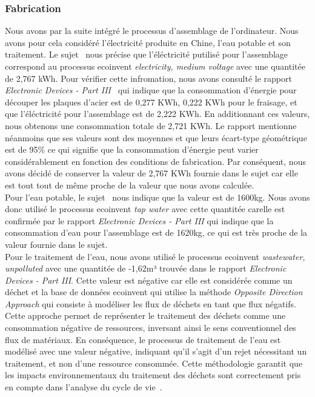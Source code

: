 \documentclass[12pt,a4paper]{paper}
\begin{document}
\subsubsection{Fabrication}
Nous avons par la suite intégré le processus d'assemblage de l'ordinateur. Nous avons pour cela considéré l'électricité produite en Chine, l'eau potable et son traitement.
Le sujet~\cite{TP2_ACV_ENSEIRB-MATMECA} nous précise que l'éléctricité putilisé pour l'assemblage correspond au processus ecoinvent \textit{electricity,
medium voltage} avec une quantitée de 2,767 kWh. Pour vérifier cette infromation, nous avons consulté le rapport \textit{Electronic Devices - Part III}~\cite{Lehmann2007} qui indique que la consommation d'énergie pour découper les plaques d'acier est de 0,277 KWh, 0,222 KWh pour le fraisage, et que l'éléctricité pour l'assemblage est de 2,222 KWh. En additionnant ces valeurs, nous obtenons une consommation totale de 2,721 KWh. Le rapport mentionne néanmoins que ses valeurs sont des moyennes et que leurs écart-type géométrique est de 95\% ce qui signifie que la consommation d'énergie peut varier considérablement en fonction des conditions de fabrication. Par conséquent, nous avons décidé de conserver la valeur de 2,767 KWh fournie dans le sujet car elle est tout tout de même proche de la valeur que nous avons calculée.\\
Pour l'eau potable, le sujet~\cite{TP2_ACV_ENSEIRB-MATMECA} nous indique que la valeur est de 1600kg. Nous avons donc utilisé le processus ecoinvent \textit{tap water} avec cette quantitée carelle est confirmée par le rapport \textit{Electronic Devices - Part III}\cite{Lehmann2007} qui indique que la consommation d'eau pour l'assemblage est de 1620kg, ce qui est très proche de la valeur fournie dans le sujet.\\
Pour le traitement de l'eau, nous avons utilisé le processus ecoinvent \textit{wastewater, unpolluted} avec une quantitée de -1,62m³ trouvée dans le rapport \textit{Electronic Devices - Part III}\cite{Lehmann2007}. Cette valeur est négative car elle est considérée comme un déchet et la base de données ecoinvent qui utilise la méthode \textit{Opposite Direction Approach} qui consiste à modéliser les flux de déchets en tant que flux négatifs. Cette approche permet de représenter le traitement des déchets comme une consommation négative de ressources, inversant ainsi le sens conventionnel des flux de matériaux. En conséquence, le processus de traitement de l’eau est modélisé avec une valeur négative, indiquant qu’il s’agit d’un rejet nécessitant un traitement, et non d’une ressource consommée. Cette méthodologie garantit que les impacts environnementaux du traitement des déchets sont correctement pris en compte dans l’analyse du cycle de vie~\cite{openLCATutorial2020}.
\end{document}
